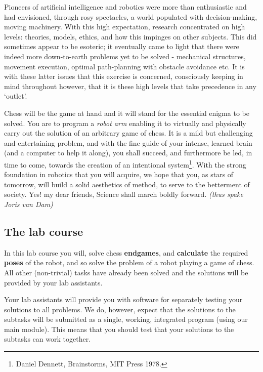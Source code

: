 \documentclass[10pt]{scrartcl}
\begin{document}
Pioneers of artificial intelligence and robotics were more than
enthusiastic and had envisioned, through rosy spectacles, a world
populated with decision-making, moving machinery. With this high
expectation, research concentrated on high levels: theories, models,
ethics, and how this impinges on other subjects. This did sometimes
appear to be esoteric; it eventually came to light that there were
indeed more down-to-earth problems yet to be solved - mechanical
structures, movement execution, optimal path-planning with obstacle
avoidance etc. It is with these latter issues that this exercise is
concerned, consciously keeping in mind throughout however, that it is
these high levels that take precedence in any `outlet'.

Chess will be the game at hand and it will stand for the essential
enigma to be solved. You are to program a {\em robot arm} enabling it to
virtually and physically carry out the solution of an arbitrary game of chess. It is a
mild but challenging and entertaining problem, and with the fine guide
of your intense, learned brain (and a computer to help it along), you
shall succeed, and furthermore be led, in time to come, towards the
creation of an intentional system\footnote{Daniel Dennett, Brainstorms,
MIT Press 1978.}. With the strong foundation in robotics that you will
acquire, we hope that you, as stars of tomorrow, will build a solid
aesthetics of method, to serve to the betterment of society. Yes! my
dear friends, Science shall march boldly forward. 
\hfill {\em (thus spake Joris van Dam)}

\subsection{The lab course}

In this lab course you will, solve chess {\bfseries endgames},
and {\bfseries calculate}
the required {\bfseries poses} of the robot, and so solve the problem of
a robot playing a game of chess. All other (non-trivial) tasks have
already been solved and the solutions will be provided by your lab assistants.


Your lab assistants will provide you with software for
separately testing your solutions to all problems. We do, however,
expect that the solutions to the 
subtasks will be submitted as a
single, working, integrated program (using our main module). This means
that you should test that your solutions to the subtasks can work
together.
\end{document}
